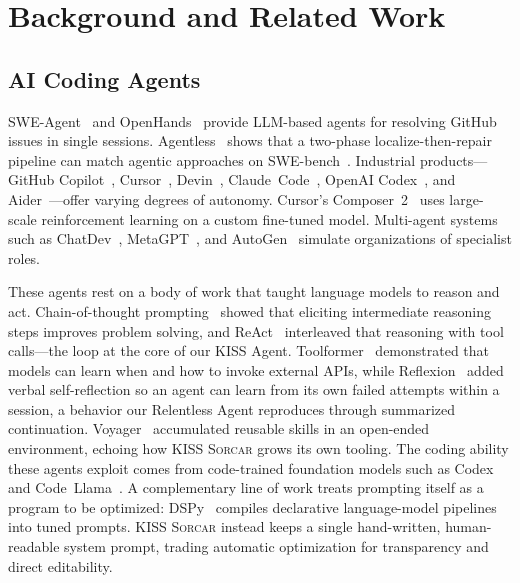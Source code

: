 \documentclass{article}
\newcommand{\kisssys}{\textsc{KISS Sorcar}}
\begin{document}
\section{Background and Related Work}
\label{sec:background}

\subsection{AI Coding Agents}

SWE-Agent~\cite{yang2024sweagent} and OpenHands~\cite{wang2024openhands}
provide LLM-based agents for resolving GitHub issues in single sessions.
Agentless~\cite{xia2024agentless} shows that a two-phase
localize-then-repair pipeline can match agentic approaches on
SWE-bench~\cite{jimenez2024swebench}.
Industrial products---GitHub Copilot~\cite{copilot2021},
Cursor~\cite{cursor2024}, Devin~\cite{devin2024},
Claude~Code~\cite{claudecode2025}, OpenAI Codex~\cite{codex2025},
and Aider~\cite{aider2023}---offer varying degrees of autonomy.
Cursor's Composer~2~\cite{cursor2026composer2} uses large-scale
reinforcement learning on a custom fine-tuned model.
Multi-agent systems such as
ChatDev~\cite{qian2024chatdev},
MetaGPT~\cite{hong2024metagpt}, and
AutoGen~\cite{wu2023autogen} simulate organizations of specialist
roles.

These agents rest on a body of work that taught language models to
reason and act.
Chain-of-thought prompting~\cite{wei2022chain} showed that eliciting
intermediate reasoning steps improves problem solving, and
ReAct~\cite{yao2023react} interleaved that reasoning with tool calls---the
loop at the core of our KISS Agent.
Toolformer~\cite{schick2023toolformer} demonstrated that models can
learn when and how to invoke external APIs, while
Reflexion~\cite{shinn2023reflexion} added verbal self-reflection so an
agent can learn from its own failed attempts within a session, a
behavior our Relentless Agent reproduces through summarized
continuation.
Voyager~\cite{wang2023voyager} accumulated reusable skills in an
open-ended environment, echoing how \kisssys{} grows its own tooling.
The coding ability these agents exploit comes from code-trained
foundation models such as Codex~\cite{chen2021evaluating} and
Code~Llama~\cite{roziere2023code}.
A complementary line of work treats prompting itself as a program to be
optimized: DSPy~\cite{khattab2024dspy} compiles declarative language-model
pipelines into tuned prompts.
\kisssys{} instead keeps a single hand-written, human-readable system
prompt, trading automatic optimization for transparency and direct
editability.
\end{document}

